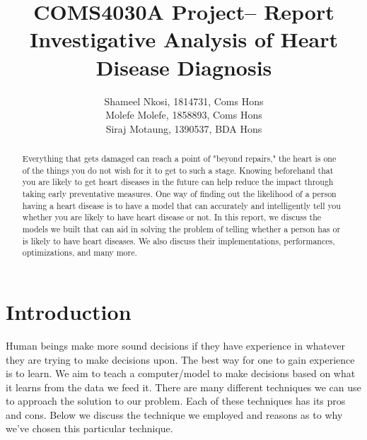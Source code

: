 
\title{
    COMS4030A Project-- Report \\
    Investigative Analysis of Heart Disease Diagnosis
    }
\author{
    Shameel Nkosi, 1814731, Coms Hons \\
    Molefe Molefe, 1858893, Coms Hons \\
    Siraj Motaung, 1390537, BDA Hons\\
    }

\maketitle 
\pagestyle{fancy}
\fancyhf{}
\fancyhead[R]{\thepage}
{} 

\newpage
\tableofcontents

\newpage
\vspace*{\fill}
\begin{abstract}
    \begin{center}
        Everything that gets damaged can reach a point of "beyond repairs," the heart is one of the things you do not wish for it to get to such a stage. Knowing beforehand that you are likely to get heart diseases in the future can help reduce the impact through taking early preventative measures. One way of finding out the likelihood of a person having a heart disease is to have a model that can accurately and intelligently tell you whether you are likely to have heart disease or not. In this report, we discuss the models we built that can aid in solving the problem of telling whether a person has or is likely to have heart diseases. We also discuss their implementations, performances, optimizations, and many more. 
    \end{center}
\end{abstract}
\vspace*{\fill}
\newpage
{}

\section{Introduction}
Human beings make more sound decisions if they have experience in whatever they are trying to make decisions upon. The best way for one to gain experience is to learn. We aim to teach a computer/model to make decisions based on what it learns from the data we feed it. There are many different techniques we can use to approach the solution to our problem. Each of these techniques has its pros and cons. Below we discuss the technique we employed and reasons as to why we've chosen this particular technique.

